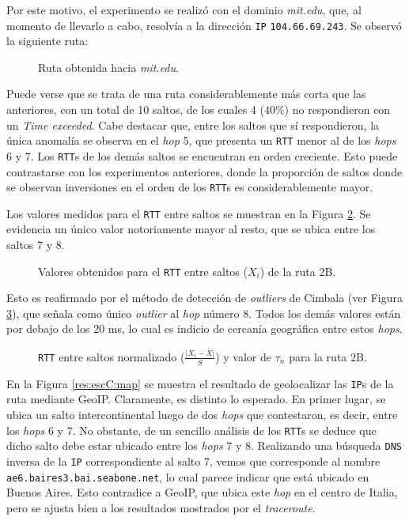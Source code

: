 Por este motivo, el experimento se realizó con el dominio \emph{mit.edu}, que,
al momento de llevarlo a cabo, resolvía a la dirección \texttt{IP}
\texttt{104.66.69.243}. Se observó la siguiente ruta:

\begin{figure}[H]
    \caption{Ruta obtenida hacia \emph{mit.edu}.}
    \label{res:escC:table}
\end{figure}

Puede verse que se trata de una ruta considerablemente más corta que las
anteriores, con un total de 10 saltos, de los cuales 4 ($40\%$) no
respondieron con un \emph{Time exceeded}. Cabe destacar que, entre los saltos
que sí respondieron, la única anomalía se observa en el \emph{hop} 5, que
presenta un \texttt{RTT} menor al de los \emph{hops} 6 y 7. Los \texttt{RTT}s
de los demás saltos se encuentran en orden creciente. Esto puede contrastarse
con los experimentos anteriores, donde la proporción de saltos donde se
observan inversiones en el orden de los \texttt{RTT}s es considerablemente
mayor.

Los valores medidos para el \texttt{RTT} entre saltos se muestran en
la Figura \ref{res:escC:rtt}. Se evidencia un único valor notoriamente mayor
al resto, que se ubica entre los saltos 7 y 8.

\begin{figure}[H]
    \caption{Valores obtenidos para el \texttt{RTT} entre saltos ($X_i$) de la ruta 2B.}
    \label{res:escC:rtt}
\end{figure}

Esto es reafirmado por el método de detección de \emph{outliers} de Cimbala
(ver Figura \ref{res:escC:rttnorm}), que señala como único \emph{outlier} al
\emph{hop} número 8. Todos los demás valores están por debajo de los 20 ms,
lo cual es indicio de cercanía geográfica entre estos \emph{hops}.

\begin{figure}[H]
    \caption{\texttt{RTT} entre saltos normalizado ($\frac{\vert X_i-\bar{X}\vert}{S}$)
    y valor de $\tau_n$ para la ruta 2B.}
    \label{res:escC:rttnorm}
\end{figure}

En la Figura \ref{res:escC:map} se muestra el resultado de geolocalizar las
\texttt{IP}s de la ruta mediante GeoIP. Claramente, es distinto lo esperado.
En primer lugar, se ubica un salto intercontinental luego de dos \emph{hops}
que contestaron, es decir, entre los \emph{hops} 6 y 7. No obstante, de
un sencillo análisis de los \texttt{RTT}s se deduce que dicho salto debe
estar ubicado entre los \emph{hops} 7 y 8. Realizando una búsqueda
\texttt{DNS} inversa de la \texttt{IP} correspondiente al salto 7, vemos que
corresponde al nombre \texttt{ae6.baires3.bai.seabone.net}, lo cual parece
indicar que está ubicado en Buenos Aires. Esto contradice a GeoIP, que ubica
este \emph{hop} en el centro de Italia, pero se ajusta bien a los resultados
mostrados por el \emph{traceroute}.

